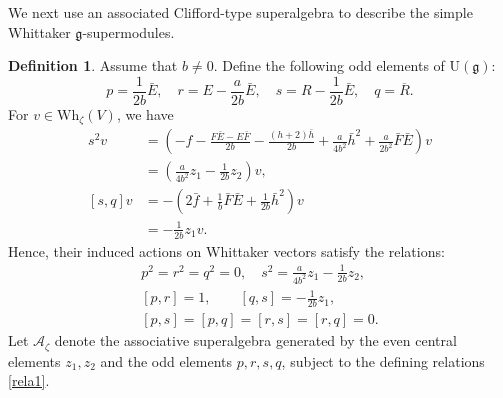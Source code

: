 \documentclass[a4paper,10pt]{article}
\theoremstyle{definition}
\newtheorem{definition}{Definition}[section]
\theoremstyle{plain}
\theoremstyle{remark}
\theoremstyle{mystyle}
\numberwithin{equation}{section}
\begin{document}
We next use an associated Clifford-type superalgebra to describe the simple Whittaker $\mathfrak g$-supermodules.
\begin{definition}
    Assume that \(b\neq0\). Define the following odd elements of $\mathrm U(\mathfrak g)$:
    $$
    p=\frac{1}{2b}\bar E,\quad r=E-\frac{a}{2b}\bar E,\quad s=R-\frac{1}{2b}\bar E,\quad q=\overline{R}.
    $$
    For $v\in \mathrm{Wh}_{\zeta}(V)$, we have 
    \[
    \begin{aligned}
    s^2v&=\left(
-f-\frac{F\bar E-E\bar F}{2b}
-\frac{(h+2)\bar h}{2b}
+\frac{a}{4b^2}\bar h^2
+\frac{a}{2b^2}\bar F\bar E
\right)v\\
&=\left(\frac{a}{4b^2}z_1-\frac1{2b}z_2\right)v,\\
[s,q]v
&=-\left(
2\bar f+\frac1b\bar F\bar E
+\frac1{2b}\bar h^2
\right)v\\
&=-\frac1{2b}z_1v.
\end{aligned}
\]
    Hence, their induced actions on Whittaker vectors satisfy the relations:
    \begin{equation}\label{rela1}
\begin{gathered}
    p^2=r^2=q^2=0, \quad s^2=\frac{a}{4b^2}z_1-\frac{1}{2b}z_2, \\
    [p, r]=1, \qquad [q, s]=-\frac{1}{2b}z_1, \\
    [p, s]=[p, q]=[r, s]=[r, q]=0.
\end{gathered}
\end{equation}
Let \(\mathcal A_\zeta\) denote the associative superalgebra generated by the even central elements \(z_1,z_2\) and the odd elements \(p,r,s,q\), subject to the defining relations \eqref{rela1}. 
\end{definition}
\end{document}
